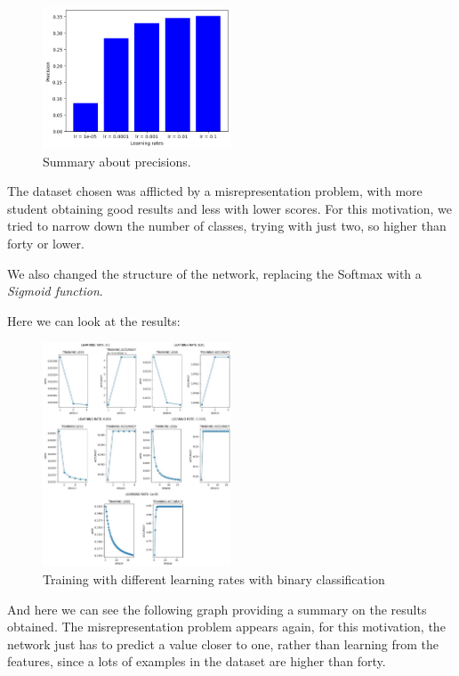 \documentclass{article}
\begin{document}
\begin{figure}
    \centering
    \includegraphics[width=0.5\textwidth]{results.png}
    \caption{\label{fig:summary}Summary about precisions.}
\end{figure}

The dataset chosen was afflicted by a misrepresentation problem, with more student obtaining good results and less with lower scores. For this motivation, we tried to narrow down the number of classes,
trying with just two, so higher than forty or lower.

We also changed the structure of the network, replacing the Softmax with a \emph{Sigmoid function}.

Here we can look at the results:

\begin{figure}
    \centering
    \includegraphics[width=0.5\textwidth]{binary_lr.jpg}
    \caption{\label{fig:binary_lr}Training with different learning rates with binary classification}
\end{figure}

And here we can see the following graph providing a summary on the results obtained. The misrepresentation problem appears again, 
for this motivation, the network just has to predict a value closer to one, rather than learning from the features, since a lots of examples in the dataset
are higher than forty.
\end{document}
